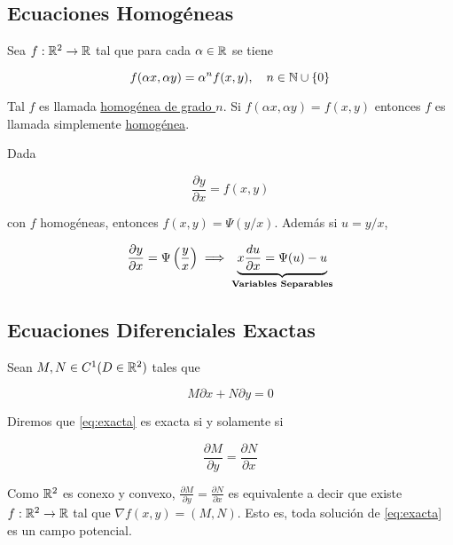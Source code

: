 \subsection{Ecuaciones Homogéneas}

\begin{defn}
    Sea $f: \mathbb{R}^2 \rightarrow \mathbb{R}$ tal que para cada $\alpha \in \mathbb{R}$ se tiene

    \[
        f(\alpha x, \alpha y) = \alpha^n f(x, y), \quad n \in \mathbb{N} \cup \{0\}
    \]

    Tal $f$ es llamada \ul{homogénea de grado $n$}. Si $f(\alpha x, \alpha y) = f(x, y)$ entonces $f$ es llamada simplemente \ul{homogénea}.
\end{defn}

\begin{pro}
    Dada

    \[
        \frac{\partial y}{\partial x} = f(x,y)
    \]

    con $f$ homogéneas, entonces $f(x, y) = \Psi (y/x) $. Además si $u = y/x$,

    \[
        \frac{\partial y}{\partial x} = \Psi \left( \frac{y}{x} \right) \implies \LaTeXunderbrace{x\frac{du}{\partial x} = \Psi(u) - u}_{\text{\textbf{Variables Separables}}}
    \]
\end{pro}

\subsection{Ecuaciones Diferenciales Exactas}

\begin{defn}
    Sean $M, N \in C^1(D \in \mathbb{R}^2)$ tales que

    \begin{equation}\label{eq:exacta}
        M \partial x + N \partial y = 0
    \end{equation}

    Diremos que \ref{eq:exacta} es exacta si y solamente si

    \[
        \displaystyle\frac{\partial M}{\partial y} = \frac{\partial N}{\partial x}
    \]
\end{defn}

\begin{teo}
    Como $\mathbb{R}^2$ es conexo y convexo, $\frac{\partial M}{\partial y} = \frac{\partial N}{\partial x}$ es equivalente a decir que existe $f: \mathbb{R}^2 \rightarrow \mathbb{R}$ tal que $\nabla f(x,y) = (M, N)$. Esto es, toda solución de \ref{eq:exacta} es un campo potencial.
\end{teo}

